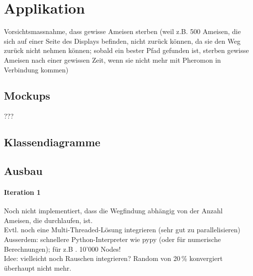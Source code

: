 
\chapter{Applikation}



Vorsichtsmassnahme, dass gewisse Ameisen sterben (weil z.B. 500 Ameisen, die sich auf einer Seite des Displays befinden, nicht zurück können, da sie den Weg zurück nicht nehmen können; sobald ein bester Pfad gefunden ist, sterben gewisse Ameisen nach einer gewissen Zeit, wenn sie nicht mehr mit Pheromon in Verbindung kommen) \\

\section{Mockups}

???

\vspace*{2cm}



\section{Klassendiagramme}



\section*{Ausbau}

\subsubsection*{Iteration 1}

Noch nicht implementiert, dass die Wegfindung abhängig von der Anzahl Ameisen, die durchlaufen, ist. \\

Evtl. noch eine Multi-Threaded-Lösung integrieren (sehr gut zu parallelisieren) \\

Ausserdem: schnellere Python-Interpreter wie pypy (oder für numerische Berechnungen); für z.B . 10'000 Nodes! \\

Idee: vielleicht noch Rauschen integrieren? Random von 20\,\% konvergiert überhaupt nicht mehr.

\vspace*{3cm}


